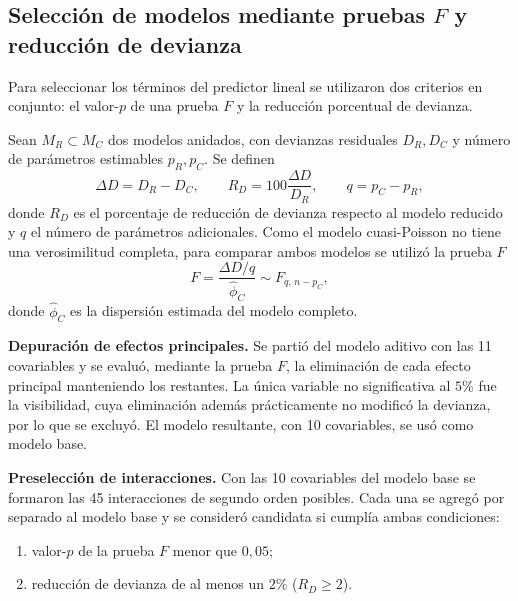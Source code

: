 \documentclass[12pt, a4paper]{article}
\numberwithin{equation}{section}
\begin{document}
\newpage

\subsection{Selección de modelos mediante pruebas $F$ y reducción de devianza}\label{sec:seleccion}
Para seleccionar los términos del predictor lineal se utilizaron dos criterios en conjunto: el valor-$p$ de una prueba $F$ y la reducción porcentual de devianza.

Sean $M_R\subset M_C$ dos modelos anidados, con devianzas residuales $D_R,D_C$ y número de parámetros estimables $p_R,p_C$. Se definen
\begin{equation}\label{eq:criterio}
\Delta D=D_R-D_C,\qquad R_D=100\frac{\Delta D}{D_R},\qquad q=p_C-p_R,
\end{equation}
donde $R_D$ es el porcentaje de reducción de devianza respecto al modelo reducido y $q$ el número de parámetros adicionales. Como el modelo cuasi-Poisson no tiene una verosimilitud completa, para comparar ambos modelos se utilizó la prueba $F$ \cite{mccullagh,dunn}
\[
F=\frac{\Delta D/q}{\widehat\phi_C}\sim F_{q,\,n-p_C},
\]
donde $\widehat\phi_C$ es la dispersión estimada del modelo completo.

\textbf{Depuración de efectos principales.} Se partió del modelo aditivo con las 11 covariables y se evaluó, mediante la prueba $F$, la eliminación de cada efecto principal manteniendo los restantes. La única variable no significativa al $5\%$ fue la visibilidad, cuya eliminación además prácticamente no modificó la devianza, por lo que se excluyó. El modelo resultante, con 10 covariables, se usó como modelo base.

\textbf{Preselección de interacciones.} Con las 10 covariables del modelo base se formaron las 45 interacciones de segundo orden posibles. Cada una se agregó por separado al modelo base y se consideró candidata si cumplía ambas condiciones:
\begin{enumerate}
\item valor-$p$ de la prueba $F$ menor que $0{,}05$;
\item reducción de devianza de al menos un $2\%$ ($R_D\geq 2$).
\end{enumerate}
\end{document}
